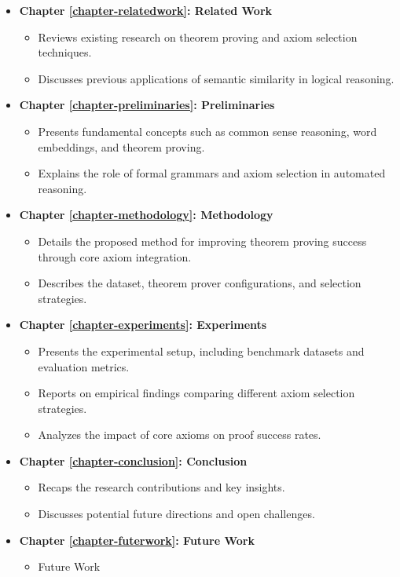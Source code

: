 \documentclass[english,version-2020-11]{uzl-thesis}
\begin{document}
\begin{itemize}

    \item \textbf{Chapter \ref{chapter-relatedwork}: Related Work}  
    \begin{itemize}
        \item Reviews existing research on theorem proving and axiom selection techniques.
        \item Discusses previous applications of semantic similarity in logical reasoning.
    \end{itemize}

    \item \textbf{Chapter \ref{chapter-preliminaries}: Preliminaries}  
    \begin{itemize}
        \item Presents fundamental concepts such as common sense reasoning, word embeddings, and theorem proving.
        \item Explains the role of formal grammars and axiom selection in automated reasoning.
    \end{itemize}

    \item \textbf{Chapter \ref{chapter-methodology}: Methodology}  
    \begin{itemize}
        \item Details the proposed method for improving theorem proving success through core axiom integration.
        \item Describes the dataset, theorem prover configurations, and selection strategies.
    \end{itemize}

    \item \textbf{Chapter \ref{chapter-experiments}: Experiments}  
    \begin{itemize}
        \item Presents the experimental setup, including benchmark datasets and evaluation metrics.
        \item Reports on empirical findings comparing different axiom selection strategies.
        \item Analyzes the impact of core axioms on proof success rates.
    \end{itemize}

    \item \textbf{Chapter \ref{chapter-conclusion}: Conclusion}  
    \begin{itemize}
        \item Recaps the research contributions and key insights.
        \item Discusses potential future directions and open challenges.
    \end{itemize}

    \item \textbf{Chapter \ref{chapter-futerwork}: Future Work}  
    \begin{itemize}
        \item Future Work
    \end{itemize}    
\end{itemize}
\end{document}
